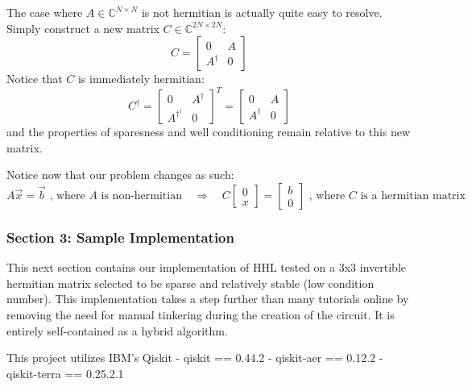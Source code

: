 \documentclass[11pt]{article}
\begin{document}
The case where \(A \in \mathbb{C}^{N\times N}\) is not hermitian is
actually quite easy to resolve. Simply construct a new matrix
\(C \in \mathbb{C}^{2N \times 2N}\):
\[ C = \begin{bmatrix}0&A\\A^{\dagger}&0\end{bmatrix} \] Notice that
\(C\) is immediately hermitian:
\[ C^{\dagger} = \begin{bmatrix}0&A^{\dagger}\\A^{\dagger^{\dagger}}&0\end{bmatrix}^T = \begin{bmatrix}0&A\\A^{\dagger}&0\end{bmatrix} \]
and the properties of sparesness and well conditioning remain relative
to this new matrix.

Notice now that our problem changes as such:
\[A\vec{x}=\vec{b} \text{ ,  where } A \text{ is non-hermitian} \quad\Rightarrow\quad C\begin{bmatrix}0\\x\end{bmatrix} = \begin{bmatrix}b\\0\end{bmatrix} \text{ ,  where } C \text{ is a hermitian matrix} \]

    \subsubsection{Section 3: Sample
Implementation}\label{section-3-sample-implementation}

This next section contains our implementation of HHL tested on a 3x3
invertible hermitian matrix selected to be sparse and relatively stable
(low condition number). This implementation takes a step further than
many tutorials online by removing the need for manual tinkering during
the creation of the circuit. It is entirely self-contained as a hybrid
algorithm.

This project utilizes IBM's Qiskit - qiskit == 0.44.2 - qiskit-aer ==
0.12.2 - qiskit-terra == 0.25.2.1
\end{document}
